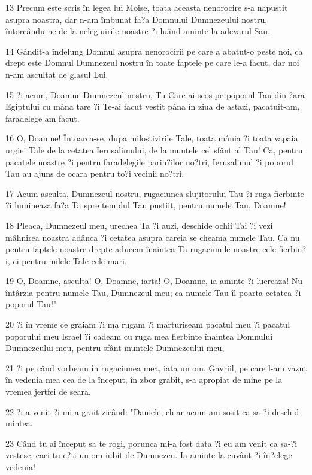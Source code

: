 \par 13 Precum este scris în legea lui Moise, toata aceasta nenorocire s-a napustit asupra noastra, dar n-am îmbunat fa?a Domnului Dumnezeului nostru, întorcându-ne de la nelegiuirile noastre ?i luând aminte la adevarul Sau.
\par 14 Gândit-a îndelung Domnul asupra nenorocirii pe care a abatut-o peste noi, ca drept este Domnul Dumnezeul nostru în toate faptele pe care le-a facut, dar noi n-am ascultat de glasul Lui.
\par 15 ?i acum, Doamne Dumnezeul nostru, Tu Care ai scos pe poporul Tau din ?ara Egiptului cu mâna tare ?i Te-ai facut vestit pâna în ziua de astazi, pacatuit-am, faradelege am facut.
\par 16 O, Doamne! Întoarca-se, dupa milostivirile Tale, toata mânia ?i toata vapaia urgiei Tale de la cetatea Ierusalimului, de la muntele cel sfânt al Tau! Ca, pentru pacatele noastre ?i pentru faradelegile parin?ilor no?tri, Ierusalimul ?i poporul Tau au ajuns de ocara pentru to?i vecinii no?tri.
\par 17 Acum asculta, Dumnezeul nostru, rugaciunea slujitorului Tau ?i ruga fierbinte ?i lumineaza fa?a Ta spre templul Tau pustiit, pentru numele Tau, Doamne!
\par 18 Pleaca, Dumnezeul meu, urechea Ta ?i auzi, deschide ochii Tai ?i vezi mâhnirea noastra adânca ?i cetatea asupra careia se cheama numele Tau. Ca nu pentru faptele noastre drepte aducem înaintea Ta rugaciunile noastre cele fierbin?i, ci pentru milele Tale cele mari.
\par 19 O, Doamne, asculta! O, Doamne, iarta! O, Doamne, ia aminte ?i lucreaza! Nu întârzia pentru numele Tau, Dumnezeul meu; ca numele Tau îl poarta cetatea ?i poporul Tau!"
\par 20 ?i în vreme ce graiam ?i ma rugam ?i marturiseam pacatul meu ?i pacatul poporului meu Israel ?i cadeam cu ruga mea fierbinte înaintea Domnului Dumnezeului meu, pentru sfânt muntele Dumnezeului meu,
\par 21 ?i pe când vorbeam în rugaciunea mea, iata un om, Gavriil, pe care l-am vazut în vedenia mea cea de la început, în zbor grabit, s-a apropiat de mine pe la vremea jertfei de seara.
\par 22 ?i a venit ?i mi-a grait zicând: "Daniele, chiar acum am sosit ca sa-?i deschid mintea.
\par 23 Când tu ai început sa te rogi, porunca mi-a fost data ?i eu am venit ca sa-?i vestesc, caci tu e?ti un om iubit de Dumnezeu. Ia aminte la cuvânt ?i în?elege vedenia!
